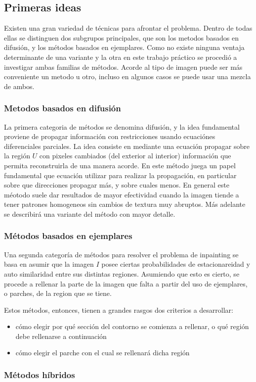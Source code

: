 \documentclass[assd_tpf_main.tex]{subfiles}
\begin{document}
\subsection{Primeras ideas}
Existen una gran variedad de técnicas para afrontar el problema. Dentro de todas ellas se distinguen dos subgrupos principales, que son los metodos basados en difusión, y los métodos basados en ejemplares. Como no existe ninguna ventaja determinante de una variante y la otra en este trabajo práctico se procedió a investigar ambas familias de métodos. Acorde al tipo de imagen puede ser más conveniente un metodo u otro, incluso en algunos casos se puede usar una mezcla de ambos.

\subsubsection{Metodos basados en difusión}
La primera categoria de métodos se denomina difusión, y la idea fundamental proviene de propagar información con restricciones usando ecuaciónes diferenciales parciales. La idea consiste en mediante una ecuación propagar sobre la región $U$ con pixeles cambiados (del exterior al interior) información que permita reconstruirla de una manera acorde.
En este método juega un papel fundamental que ecuación utilizar para realizar la propagación, en particular sobre que direcciones propagar más, y sobre cuales menos. En general este méotodo suele dar resultados de mayor efectividad cuando la imagen tiende a tener patrones homogeneos sin cambios de textura muy abruptos.  Más adelante se describirá una variante del método con mayor detalle.

\subsubsection{Métodos basados en ejemplares}
Una segunda categor\'ia de m\'etodos para resolver el problema de inpainting se basa en 
asumir que la imagen $I$ posee ciertas probabilidades de estacionareidad y auto similaridad 
entre sus distintas regiones. Asumiendo que esto es cierto, se procede a rellenar la parte
de la imagen que falta a partir del uso de ejemplares, o parches, de la region que se tiene.

Estos m\'etodos, entonces, tienen a grandes rasgos dos criterios a desarrollar:
\begin{itemize}
	\item c\'omo elegir por qu\'e secci\'on del contorno se comienza a rellenar, o qu\'e
	regi\'on debe rellenarse a continuaci\'on
	\item c\'omo elegir el parche con el cual se rellenar\'a dicha regi\'on
\end{itemize}




\subsubsection{M\'etodos h\'ibridos}
\end{document}
